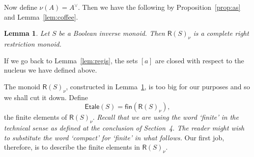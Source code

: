 \documentclass[a4paper]{amsart}
\newtheorem{lemma}[theorem]{Lemma}
\begin{document}
Now define $\nu (A) = A^{\vee}$.
Then we have the following by Proposition~\ref{prop:as} and Lemma~\ref{lem:coffee}.

\begin{lemma}\label{lem:rubin} Let $S$ be a Boolean inverse monoid.
Then $\mathsf{R}(S)_{\nu}$ is a complete right restriction monoid.
\end{lemma}

If we go back to Lemma~\ref{lem:regis},
the sets $[a]$ are closed with respect to the nucleus we have defined above. 

The monoid  $\mathsf{R}(S)_{\nu}$, constructed in Lemma~\ref{lem:rubin}, is too big for our purposes
and so we shall cut it down.
Define 
$$\mathsf{Etale}(S) = \mathsf{fin}(\mathsf{R}(S)_{\nu}),$$
the finite elements of $\mathsf{R}(S)_{\nu}$.
{\em Recall that we are using the word `finite' in the technical sense as defined at the conclusion of Section~4.
The reader might wish to substitute the word `compact' for `finite' in what follows.}
Our first job, therefore, is to describe  the finite elements in $\mathsf{R}(S)_{\nu}$.
\end{document}
